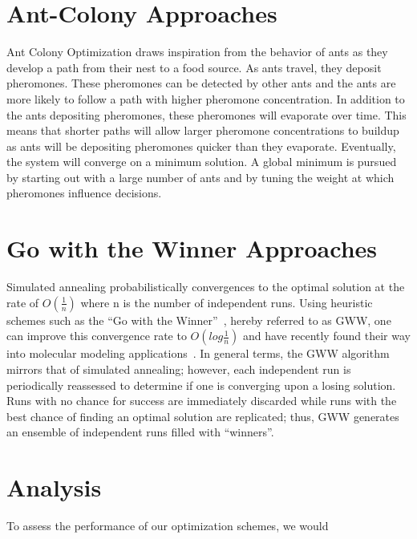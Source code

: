 \documentclass[12pt,onecolumn,notitlepage]{article}
\begin{document}
\section{Ant-Colony Approaches}
Ant Colony Optimization\cite{Dorigo96theant} draws inspiration from the behavior of ants as they develop a path from their nest to a food source.  As ants travel, they deposit pheromones.  These pheromones can be detected by other ants and the ants are more likely to follow a path with higher pheromone concentration.  In addition to the ants depositing pheromones, these pheromones will evaporate over time.  This means that shorter paths will allow larger pheromone concentrations to buildup as ants will be depositing pheromones quicker than they evaporate.  Eventually, the system will converge on a minimum solution.  A global minimum is pursued by starting out with a large number of ants and by tuning the weight at which pheromones influence decisions. 

\section{Go with the Winner Approaches}
Simulated annealing probabilistically convergences to the optimal solution at the rate
 of $O(\frac{1}{n})$ where n is the number of independent runs.  
Using heuristic schemes such as the ``Go with the Winner''~\cite{Aldous1994gwt}, hereby referred to as GWW, 
one can improve this convergence rate to $O(log \frac{1}{n})$ and have recently found their way into molecular modeling applications~\cite{Peinado1997gwt}.  In general terms, the GWW algorithm mirrors that of simulated annealing; however, each independent run is periodically reassessed to determine if one is converging upon a losing solution.  Runs with 
no chance for success are immediately discarded while runs with the best chance of finding an optimal solution
are replicated; thus, GWW generates an ensemble of independent runs filled with  ``winners''.  

\section{Analysis}
To assess the performance of our optimization schemes, we would




\end{document}
